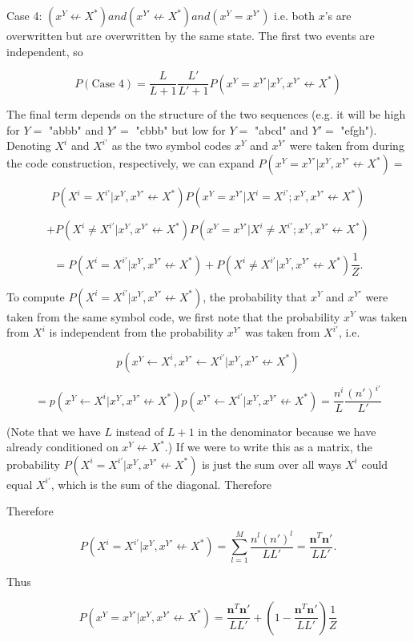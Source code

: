 \documentclass{article}
\begin{document}
Case 4: $(x^Y \not \leftarrow X^*) and (x^{Y'} \not \leftarrow X^*) and (x^Y = x^{Y'})$ i.e. both $x$'s are overwritten but are overwritten by the same state. The first two events are independent, so

$$P(\textrm{Case 4}) = \frac{L}{L+1}\frac{L'}{L'+1}P(x^Y = x^{Y'} | x^Y, x^{Y'} \not \leftarrow X^*)$$

The final term depends on the structure of the two sequences (e.g. it will be high for $Y =$ "abbb" and $Y' =$ "cbbb" but low for $Y =$ "abcd" and $Y' =$ "efgh"). Denoting $X^i$ and $X^{i'}$ as the two symbol codes $x^Y$ and $x^{Y'}$ were taken from during the code construction, respectively, we can expand $P(x^Y = x^{Y'} | x^Y, x^{Y'} \not \leftarrow X^*) =$

$$P(X^i = X^{i'}| x^Y, x^{Y'} \not \leftarrow X^*)P(x^Y = x^{Y'}|X^i = X^{i'}; x^Y, x^{Y'} \not \leftarrow X^*)$$

$$+ P(X^i \neq X^{i'} | x^Y, x^{Y'} \not \leftarrow X^*)P(x^Y = x^{Y'}|X^i \neq X^{i'}; x^Y, x^{Y'} \not \leftarrow X^*)$$

$$ = P(X^i = X^{i'}| x^Y, x^{Y'} \not \leftarrow X^*) + P(X^i \neq X^{i'}| x^Y, x^{Y'} \not \leftarrow X^*)\frac{1}{Z}.$$

To compute $P(X^i = X^{i'}| x^Y, x^{Y'} \not \leftarrow X^*)$, the probability that $x^Y$ and $x^{Y'}$ were taken from the same symbol code, we first note that the probability $x^Y$ was taken from $X^i$ is independent from the probability $x^{Y'}$ was taken from $X^{i'}$, i.e.

$$p(x^Y \leftarrow X^i, x^{Y'} \leftarrow X^{i'}| x^Y, x^{Y'} \not \leftarrow X^*)$$

$$ = p(x^Y \leftarrow X^i| x^Y, x^{Y'} \not \leftarrow X^*)p(x^{Y'} \leftarrow X^{i'}| x^Y, x^{Y'} \not \leftarrow X^*)= \frac{n^i}{L}\frac{(n')^{i'}}{L'}$$

(Note that we have $L$ instead of $L + 1$ in the denominator because we have already conditioned on $x^Y \not \leftarrow X^*$.) If we were to write this as a matrix, the probability $P(X^i = X^{i'}| x^Y, x^{Y'} \not \leftarrow X^*)$ is just the sum over all ways $X^i$ could equal $X^{i'}$, which is the sum of the diagonal. Therefore

Therefore

$$P(X^i = X^{i'}| x^Y, x^{Y'} \not \leftarrow X^*) = \sum\limits_{l = 1}^M\frac{n^l(n')^l}{LL'} = \frac{\mathbf{n}^T\mathbf{n}'}{LL'}.$$

Thus 

$$P(x^Y = x^{Y'}| x^Y, x^{Y'} \not \leftarrow X^*) = \frac{\mathbf{n}^T\mathbf{n}'}{LL'} + \left(1 - \frac{\mathbf{n}^T\mathbf{n}'}{LL'}\right)\frac{1}{Z}$$
\end{document}
